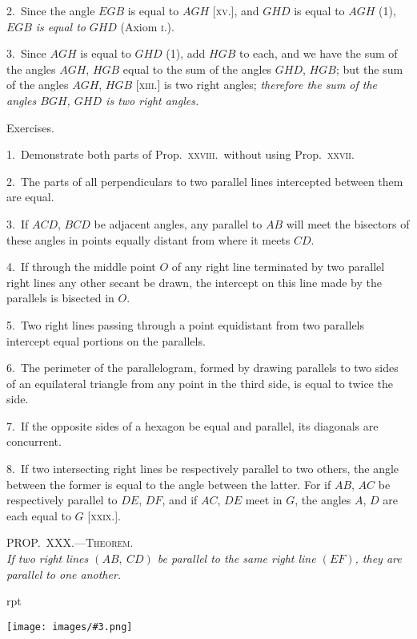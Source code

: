 \documentclass[oneside]{book}
\newcounter{wrapwidth}
\newcommand\myprop[2]{
\bigskip\Needspace*{4\baselineskip}\begin{center}\textsc{#1}\\\medskip\emph{#2}\par\end{center}
}
\newcommand\exhead[1]{
\Needspace*{5\baselineskip}\begin{center}
\textsf{#1}
\end{center}
}
\newcommand\imgflow[3]{
\setcounter{wrapwidth}{#1}
\begin{wrapfigure}[#2]{r}{\value{wrapwidth}pt}
\begin{center}
\vspace{-0.3in}
\texttt{[image: images/\#3.png]}
\end{center}
\end{wrapfigure}
}
\begin{document}
2.~Since the angle $EGB$ is equal to $AGH$ [\textsc{xv.}], and
$GHD$ is equal to $AGH$ (1), $EGB$ \emph{is equal to} $GHD$
(Axiom \textsc{i}.).

3.~Since $AGH$ is equal to $GHD$ (1), add $HGB$ to each,
and we have the sum of the angles $AGH$, $HGB$ equal
to the sum of the angles $GHD$, $HGB$; but the sum of the
angles $AGH$, $HGB$ [\textsc{xiii.}] is two right angles; \textit{therefore
the sum of the angles $BGH$, $GHD$ is two right angles.}

\exhead{Exercises.}

\begin{footnotesize}
1.~Demonstrate both parts of Prop.\ \textsc{xxviii.}\ without using Prop.\
\textsc{xxvii}.

2.~The parts of all perpendiculars to two parallel lines intercepted
between them are equal.

3.~If $ACD$, $BCD$ be adjacent angles, any parallel to $AB$ will
meet the bisectors of these angles in points equally distant from
where it meets $CD$.


4.~If through the middle point $O$ of any right line terminated
by two parallel right lines any other secant be drawn, the intercept
on this line made by the parallels is bisected in $O$.

5.~Two right lines passing through a point equidistant from
two parallels intercept equal portions on the parallels.

6.~The perimeter of the parallelogram, formed by drawing
parallels to two sides of an equilateral triangle from any point in
the third side, is equal to twice the side.

7.~If the opposite sides of a hexagon be equal and parallel, its
diagonals are concurrent.

8.~If two intersecting right lines be respectively parallel to two
others, the angle between the former is equal to the angle between
the latter. For if $AB$, $AC$ be respectively parallel to $DE$,
$DF$, and if $AC$, $DE$ meet in $G$, the angles $A$, $D$ are each equal to
$G$ [\textsc{xxix}.].
\par\end{footnotesize}


\myprop{PROP\@.~XXX\@.---Theorem.}{If two right lines $(AB,\ CD)$ be parallel to the same right
line $(EF)$, they are parallel to one another.}

\imgflow{125}{7}{f050}
\end{document}
